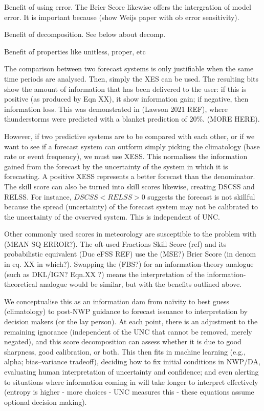 \documentclass[draft]{ametsoc}
\begin{document}
Benefit of using error. The Brier Score likewise offers the intergration of model error. It is important because (show Weijs paper with ob error sensitivity).

Benefit of decomposition. See below about decomp.

Benefit of properties like unitless, proper, etc

The comparison between two forecast systems is only justifiable when the same time periods are analysed. Then, simply the XES can be used. The resulting bits show the amount of information that has been delivered to the user: if this is positive (as produced by Eqn XX), it show information gain; if negative, then information loss. This was demonstrated in (Lawson 2021 REF), where thunderstorms were predicted with a blanket prediction of 20\%. (MORE HERE). 

However, if two predictive systems are to be compared with each other, or if we want to see if a forecast system can outform simply picking the climatology (base rate or event frequency), we must use XESS. This normalises the information gained from the forecast by the uncertainty of the system in which it is forecasting. A positive XESS represents a better forecast than the denominator. The skill score can also be turned into skill scores likewise, creating DSCSS and RELSS. For instance, $ DSCSS < RELSS > 0$ suggests the forecast is not skillful because the spread (uncertainty) of the forecast system may not be calibrated to the uncertainty of the ovserved system. This is independent of UNC.

Other commonly used scores in meteorology are susceptible to the problem with (MEAN SQ ERROR?). The oft-used Fractions Skill Score (ref) and its probabilistic equivalent (Duc eFSS REF) use the (MSE?) Brier Score (in denom in eq. XX in which?). Swapping the (FBS?) for an information-theory analogue (such as DKL/IGN? Eqn.XX ?) means the interpretation of the information-theoretical analogue would be similar, but with the benefits outlined above.

We conceptualise this as an information dam from na\"ivity to best guess (climatology) to post-NWP guidance to forecast issuance to interpretation by decision makers (or the lay person). At each point, there is an adjustment to the remaining ignorance (independent of the UNC that cannot be removed, merely negated), and this score decomposition can assess whether it is due to good sharpness, good calibration, or both. This then fits in machine learning (e.g., alpha; bias--variance tradeoff), deciding how to fix initial conditions in NWP/DA, evaluating human interpretation of uncertainty and confidence; and even alerting to situations where information coming in will take longer to interpret effectively (entropy is higher - more choices - UNC measures this - these equations assume optional decision making).
\end{document}
